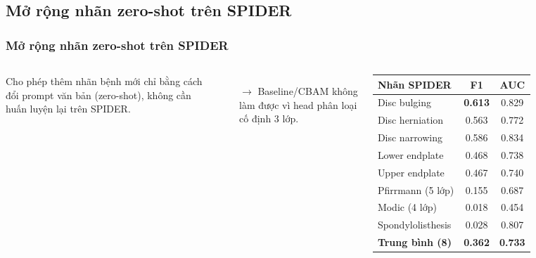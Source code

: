\documentclass{beamer}
\numberwithin{figure}{section}
\numberwithin{table}{section}
\begin{document}
\subsection{Mở rộng nhãn zero-shot trên SPIDER}
\begin{frame}
\frametitle{Mở rộng nhãn zero-shot trên SPIDER}
\begin{columns}[t]
\small
Cho phép thêm nhãn bệnh mới chỉ bằng cách đổi prompt văn bản (zero-shot), không cần huấn luyện lại trên SPIDER.
\begin{itemize}\small
    \item[$\rightarrow$] Baseline/CBAM không làm được vì head phân loại cố định 3 lớp.
\end{itemize}
\begin{table}
\centering
\footnotesize
\begin{tabular}{lcc}
\toprule
\textbf{Nhãn SPIDER} & \textbf{F1} & \textbf{AUC} \\
\midrule
Disc bulging        & \textbf{0.613} & 0.829 \\
Disc herniation     & 0.563 & 0.772 \\
Disc narrowing      & 0.586 & 0.834 \\
\midrule
Lower endplate      & 0.468 & 0.738 \\
Upper endplate      & 0.467 & 0.740 \\
Pfirrmann (5 lớp)   & 0.155 & 0.687 \\
Modic (4 lớp)       & 0.018 & 0.454 \\
Spondylolisthesis   & 0.028 & 0.807 \\
\midrule
\textbf{Trung bình (8)} & \textbf{0.362} & \textbf{0.733} \\
\bottomrule
\end{tabular}
\end{table}
\end{columns}
\end{frame}
\end{document}
